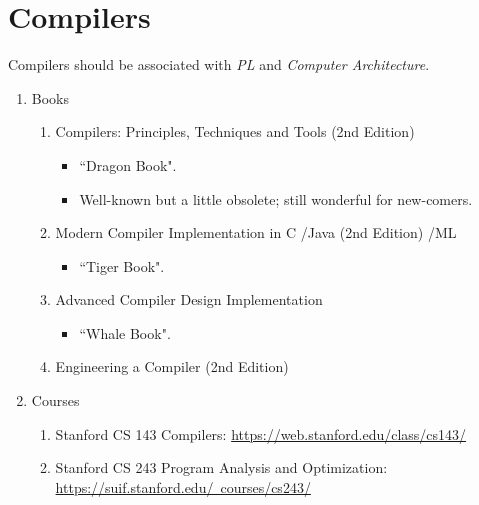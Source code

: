 \documentclass{article}
\begin{document}
\section{Compilers}
Compilers should be associated with \emph{PL} and \emph{Computer Architecture}.
\begin{enumerate}
    \item Books
    \begin{enumerate}
        \item Compilers: Principles, Techniques and Tools (2nd Edition) \cite{aho2007compilers}
        \begin{itemize}
            \item ``Dragon Book".
            \item Well-known but a little obsolete; still wonderful for new-comers.
        \end{itemize}
        \item Modern Compiler Implementation in C \cite{appel2004modern}/Java (2nd Edition) \cite{appel2003modern}/ML \cite{appel1998modern}
        \begin{itemize}
            \item ``Tiger Book".
        \end{itemize}
        \item Advanced Compiler Design Implementation \cite{muchnick1997advanced}
        \begin{itemize}
            \item ``Whale Book".
        \end{itemize}
        \item Engineering a Compiler (2nd Edition) \cite{cooper2011engineering}    
    \end{enumerate}
    
    \item Courses
    \begin{enumerate}
        \item Stanford CS 143 Compilers:
        \href{https://web.stanford.edu/class/cs143/}{https://web.stanford.edu/class/cs143/}
        \item Stanford CS 243 Program Analysis and Optimization:\\
        \href{https://suif.stanford.edu/~courses/cs243/}{https://suif.stanford.edu/~courses/cs243/}
    \end{enumerate}



\end{enumerate}
\end{document}
